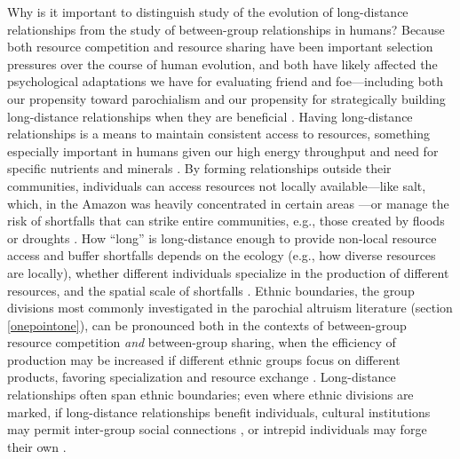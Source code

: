 \documentclass[bibauthoryear]{aa}
\begin{document}
Why is it important to distinguish study of the evolution of long-distance relationships from the study of between-group relationships in humans? Because both resource competition and resource sharing have been important selection pressures over the course of human evolution, and both have likely affected the psychological adaptations we have for evaluating friend and foe---including both our propensity toward parochialism \citep{hruschka2013economic} and our propensity for strategically building long-distance relationships when they are beneficial \citep{pisor2019evolution, pisorjones2020}. Having long-distance relationships is a means to maintain consistent access to resources, something especially important in humans given our high energy throughput and need for specific nutrients and minerals \citep{pisor2019evolution}. By forming relationships outside their communities, individuals can access resources not locally available---like salt, which, in the Amazon was heavily concentrated in certain areas \citep{reeve1993regional}---or manage the risk of shortfalls that can strike entire communities, e.g., those created by floods or droughts \citep{pisor2019evolution, pisorjones2020}. How ``long'' is long-distance enough to provide non-local resource access and buffer shortfalls depends on the ecology (e.g., how diverse resources are locally), whether different individuals specialize in the production of different resources, and the spatial scale of shortfalls \citep{pisorjones2020}. Ethnic boundaries, the group divisions most commonly investigated in the parochial altruism literature (section \ref{onepointone}), can be pronounced both in the contexts of between-group resource competition \citep{choi2007coevolution, bellmoya} \textit{and} between-group sharing, when the efficiency of production may be increased if different ethnic groups focus on different products, favoring specialization and resource exchange \citep{barth1956ecologic, brewer1976ethnocentrism, bowles2004persistent}. Long-distance relationships often span ethnic boundaries; even where ethnic divisions are marked, if long-distance relationships benefit individuals, cultural institutions may permit inter-group social connections \citep{bollig2010risk}, or intrepid individuals may forge their own \citep{pisor2019evolution, schaub2017threat}.
\end{document}
